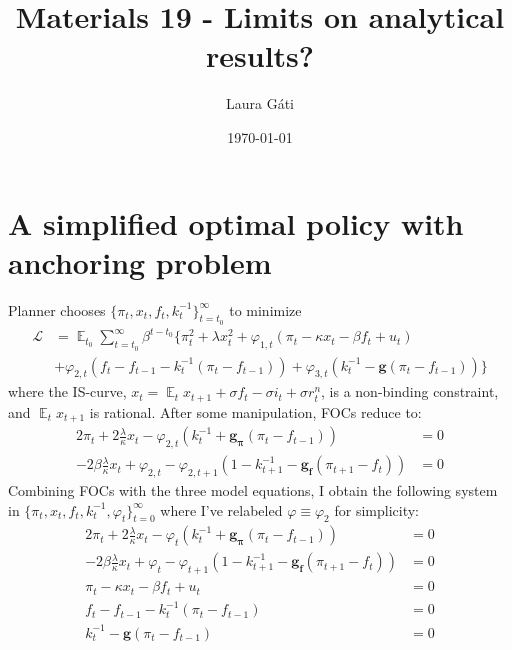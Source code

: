 \documentclass[11pt]{article}
\renewcommand{\[}{\begin{equation}}
\renewcommand{\]}{\end{equation}}
\DeclareMathOperator{\E}{\mathbb{E}}
\begin{document}
\linespread{1.0}

\title{Materials 19 - Limits on analytical results?}
\author{Laura G\'ati} 
\date{\today}
\maketitle




\section{A simplified optimal policy with anchoring problem}
Planner chooses $\{\pi_t, x_t, f_t, k_t^{-1}\}_{t=t_0}^{\infty}$ to minimize
 \begin{align*}
\mathcal{L} &= \E_{t_0}\sum_{t=t_0}^{\infty} \beta^{t-t_0}\bigg\{ \pi_t^2  + \lambda x_t^2 + \varphi_{1,t} (\pi_t -\kappa x_t- \beta f_t +u_t) \\ &+ \varphi_{2,t}(f_t - f_{t-1} -k_t^{-1}(\pi_t - f_{t-1})) + \varphi_{3,t}(k_t^{-1} - \mathbf{g}(\pi_t - f_{t-1})) \bigg\}
 \end{align*}
 where the IS-curve, $x_t = \E_t x_{t+1}+\sigma f_t -\sigma i_t +\sigma r_t^n$, is a non-binding constraint, and $\E_t x_{t+1}$ is rational. 
 After some manipulation, FOCs reduce to:
 \begin{align}
  2\pi_t +2\frac{\lambda}{\kappa}x_t -\varphi_{2,t}(k_t^{-1} + \mathbf{g_{\pi}}(\pi_t -f_{t-1}))& = 0 \label{FOC1learn} \\
  -2\beta\frac{\lambda}{\kappa}x_t + \varphi_{2,t} -\varphi_{2,t+1}(1-k_{t+1}^{-1} -\mathbf{g_{f}}(\pi_{t+1} -f_{t})) & = 0 \label{FOC2learn} 
 \end{align}
Combining FOCs with the three model equations, I obtain the following system in $\{\pi_t, x_t, f_t,k_t^{-1}, \varphi_t\}_{t=0}^{\infty}$ where I've relabeled $\varphi \equiv \varphi_2$ for simplicity:
 \begin{align}
  2\pi_t +2\frac{\lambda}{\kappa}x_t -\varphi_{t}(k_t^{-1} + \mathbf{g_{\pi}}(\pi_t -f_{t-1}))& = 0 \\
  -2\beta\frac{\lambda}{\kappa}x_t + \varphi_{t} -\varphi_{t+1}(1-k_{t+1}^{-1} -\mathbf{g_{f}}(\pi_{t+1} -f_{t})) & = 0 \\
  \pi_t -\kappa x_t- \beta f_t +u_t & = 0 \\
  f_t - f_{t-1} -k_t^{-1}(\pi_t - f_{t-1}) & = 0 \\
  k_t^{-1} - \mathbf{g}(\pi_t - f_{t-1}) & = 0 
 \end{align}
\end{document}
